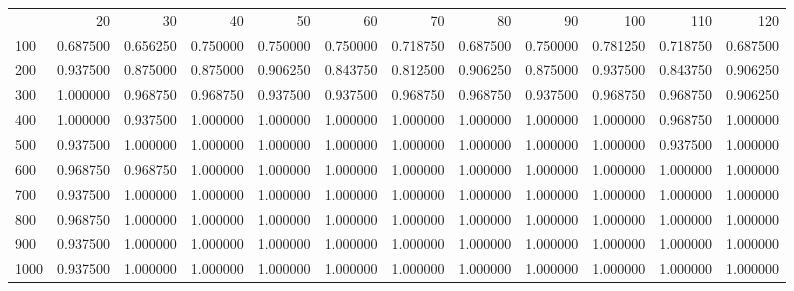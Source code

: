 \begin{tabular}{lrrrrrrrrrrr}
 & 20 & 30 & 40 & 50 & 60 & 70 & 80 & 90 & 100 & 110 & 120 \\
100 & 0.687500 & 0.656250 & 0.750000 & 0.750000 & 0.750000 & 0.718750 & 0.687500 & 0.750000 & 0.781250 & 0.718750 & 0.687500 \\
200 & 0.937500 & 0.875000 & 0.875000 & 0.906250 & 0.843750 & 0.812500 & 0.906250 & 0.875000 & 0.937500 & 0.843750 & 0.906250 \\
300 & 1.000000 & 0.968750 & 0.968750 & 0.937500 & 0.937500 & 0.968750 & 0.968750 & 0.937500 & 0.968750 & 0.968750 & 0.906250 \\
400 & 1.000000 & 0.937500 & 1.000000 & 1.000000 & 1.000000 & 1.000000 & 1.000000 & 1.000000 & 1.000000 & 0.968750 & 1.000000 \\
500 & 0.937500 & 1.000000 & 1.000000 & 1.000000 & 1.000000 & 1.000000 & 1.000000 & 1.000000 & 1.000000 & 0.937500 & 1.000000 \\
600 & 0.968750 & 0.968750 & 1.000000 & 1.000000 & 1.000000 & 1.000000 & 1.000000 & 1.000000 & 1.000000 & 1.000000 & 1.000000 \\
700 & 0.937500 & 1.000000 & 1.000000 & 1.000000 & 1.000000 & 1.000000 & 1.000000 & 1.000000 & 1.000000 & 1.000000 & 1.000000 \\
800 & 0.968750 & 1.000000 & 1.000000 & 1.000000 & 1.000000 & 1.000000 & 1.000000 & 1.000000 & 1.000000 & 1.000000 & 1.000000 \\
900 & 0.937500 & 1.000000 & 1.000000 & 1.000000 & 1.000000 & 1.000000 & 1.000000 & 1.000000 & 1.000000 & 1.000000 & 1.000000 \\
1000 & 0.937500 & 1.000000 & 1.000000 & 1.000000 & 1.000000 & 1.000000 & 1.000000 & 1.000000 & 1.000000 & 1.000000 & 1.000000 \\
\end{tabular}
